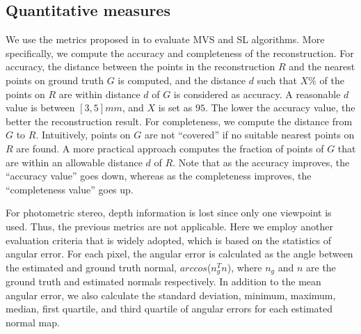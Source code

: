 \subsection{Quantitative measures}
We use the metrics proposed in \cite{seitz2006comparison} to evaluate MVS and SL algorithms. More specifically, we compute the accuracy and completeness of the reconstruction. For accuracy, the distance between the points in the reconstruction $R$ and the nearest points on ground truth $G$ is computed, and the distance $d$ such that $X\%$ of the points on $R$ are within distance $d$ of $G$ is considered as accuracy. A reasonable $d$ value is between $[3, 5]mm$, and $X$ is set as $95$. The lower the accuracy value, the better the reconstruction result. For completeness, we compute the distance from $G$ to $R$. Intuitively, points on $G$ are not ``covered'' if no suitable nearest points on $R$ are found. A more practical approach computes the fraction of points of $G$ that are within an allowable distance $d$ of $R$. Note that as the accuracy improves, the ``accuracy value'' goes down, whereas as the completeness improves, the ``completeness value'' goes up.

For photometric stereo, depth information is lost since only one viewpoint is used. Thus, the previous metrics are not applicable. Here we employ another evaluation criteria that is widely adopted, which is based on the statistics of angular error. For each pixel, the angular error is calculated as the angle between the estimated and ground truth normal, \ie $arccos$($n_g^T n$), where $n_g$ and $n$ are the ground truth and estimated normals respectively. In addition to the mean angular error, we also calculate the standard deviation, minimum, maximum, median, first quartile, and third quartile of angular errors for each estimated normal map.



